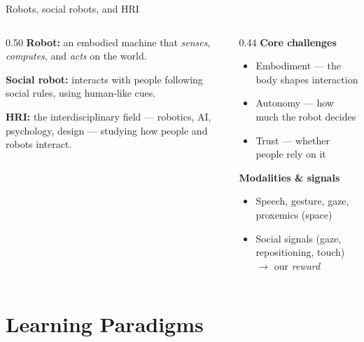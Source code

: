 \documentclass[aspectratio=169,10pt]{beamer}
\begin{document}
\begin{frame}{Robots, social robots, and HRI}
  \begin{columns}[T]
    \begin{column}{0.50\textwidth}
      \textbf{Robot:} an embodied machine that \emph{senses}, \emph{computes}, and \emph{acts} on the world.

      \medskip
      \textbf{Social robot:} interacts with people following social rules, using human-like cues.

      \medskip
      \textbf{HRI:} the interdisciplinary field --- robotics, AI, psychology, design --- studying how people and robots interact.
    \end{column}
    \begin{column}{0.44\textwidth}
      \textbf{Core challenges}
      \begin{itemize}
        \item Embodiment --- the body shapes interaction
        \item Autonomy --- how much the robot decides
        \item Trust --- whether people rely on it
      \end{itemize}
      \medskip
      \textbf{Modalities \& signals}
      \begin{itemize}
        \item Speech, gesture, gaze, \alert{proxemics} (space)
        \item \alert{Social signals} (gaze, repositioning, touch) $\rightarrow$ our \emph{reward}
      \end{itemize}
    \end{column}
  \end{columns}
\end{frame}

\section{Learning Paradigms}
\end{document}
